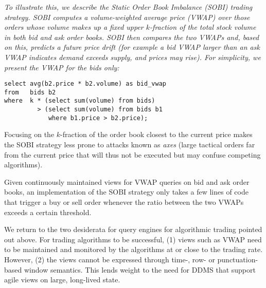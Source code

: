 \begin{example}\em
To illustrate this, we describe the Static Order Book Imbalance (SOBI) trading
strategy. SOBI computes a volume-weighted average price (VWAP) over those orders
whose volume makes up a fixed upper $k$-fraction of the total stock volume in
both bid and ask order books. SOBI then compares the two VWAPs and, based on
this, predicts a future price drift (for example a bid VWAP larger than an ask
VWAP indicates demand exceeds supply, and prices may rise). For simplicity, we
present the VWAP for the bids only:

\begin{verbatim}
select avg(b2.price * b2.volume) as bid_vwap
from   bids b2
where  k * (select sum(volume) from bids)
         > (select sum(volume) from bids b1
            where b1.price > b2.price);
\end{verbatim}

Focusing on the $k$-fraction of the order book closest to the current price
makes the SOBI strategy less prone to attacks known as {\em axes}\/ (large
tactical orders far from the current price that will thus not be executed but
may confuse competing algorithms).

Given continuously maintained views for VWAP queries on bid and ask order
books, an implementation of the SOBI strategy only takes a few lines of code
that trigger a buy or sell order whenever the ratio between the two VWAPs
exceeds a certain threshold. 
\punto
\end{example}


We return to the two desiderata for query engines for algorithmic trading
pointed out above. For trading algorithms to be successful, (1)
views such as VWAP need to be maintained and monitored by the algorithms at or
close to the trading rate. However, (2) the views cannot be expressed through
time-, row- or punctuation-based window semantics.
This lends weight to the need for DDMS that support agile views on
large, long-lived state.




